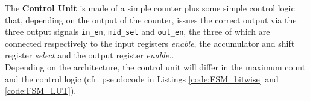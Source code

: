 The \textbf{Control Unit} is made of a simple counter plus some simple control logic that, depending on the output of the counter, issues the correct output via the three output signals \texttt{in\_en}, \texttt{mid\_sel} and \texttt{out\_en}, the three of which are connected respectively to the input registers \textit{enable}, the accumulator and shift register \textit{select} and the output register \textit{enable.}.\\
Depending on the architecture, the control unit will differ in the maximum count and the control logic (cfr. pseudocode in Listings \ref{code:FSM_bitwise} and \ref{code:FSM_LUT}).